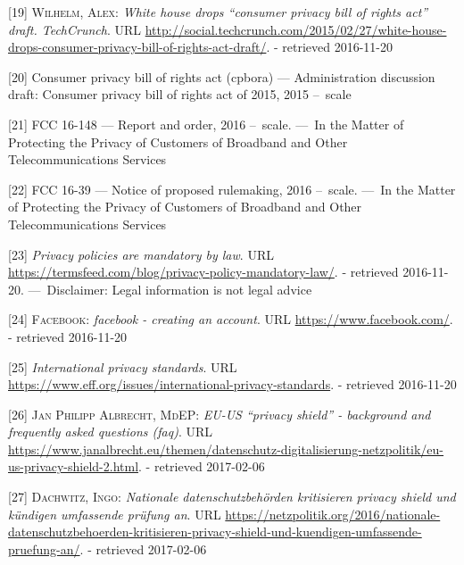 \documentclass[12pt,english,a4paper,titlepage,cleardoublepage=empty,dottedtoc]{report}
\begin{document}
\hypertarget{ref-web_2015_white-house-releases-consumer-privacy-bill-draft}{}
{[}19{]} \textsc{Wilhelm, Alex}: \emph{White house drops ``consumer
privacy bill of rights act'' draft. TechCrunch}. URL
\url{http://social.techcrunch.com/2015/02/27/white-house-drops-consumer-privacy-bill-of-rights-act-draft/}.
- retrieved 2016-11-20

\hypertarget{ref-bill-draft_2015_us_consumer-privacy-bill-of-rights-act_definition}{}
{[}20{]} Consumer privacy bill of rights act (cpbora) --- Administration
discussion draft: Consumer privacy bill of rights act of 2015, 2015
--~scale

\hypertarget{ref-rules_2016_fcc_to-protect-broadband-consumer-privacy_sensitive-types-of-data}{}
{[}21{]} FCC 16-148 --- Report and order, 2016 --~scale. ---~In the
Matter of Protecting the Privacy of Customers of Broadband and Other
Telecommunications Services

\hypertarget{ref-rules_2016_fcc_to-protect-broadband-consumer-privacy_personally-identifiable-information}{}
{[}22{]} FCC 16-39 --- Notice of proposed rulemaking, 2016 --~scale.
---~In the Matter of Protecting the Privacy of Customers of Broadband
and Other Telecommunications Services

\hypertarget{ref-web_2016_privacy-policies-are-mandatory-by-law}{}
{[}23{]} \emph{Privacy policies are mandatory by law}. URL
\url{https://termsfeed.com/blog/privacy-policy-mandatory-law/}. -
retrieved 2016-11-20. ---~Disclaimer: Legal information is not legal
advice

\hypertarget{ref-web_2016_facebooks-landing-page_policy-acknowledgement}{}
{[}24{]} \textsc{Facebook}: \emph{facebook - creating an account}. URL
\url{https://www.facebook.com/}. - retrieved 2016-11-20

\hypertarget{ref-web_2016_international-privacy-standards}{}
{[}25{]} \emph{International privacy standards}. URL
\url{https://www.eff.org/issues/international-privacy-standards}. -
retrieved 2016-11-20

\hypertarget{ref-web_2017_privacy-shield_faq}{}
{[}26{]} \textsc{Jan Philipp Albrecht, MdEP}: \emph{EU-US ``privacy
shield'' - background and frequently asked questions (faq)}. URL
\url{https://www.janalbrecht.eu/themen/datenschutz-digitalisierung-netzpolitik/eu-us-privacy-shield-2.html}.
- retrieved 2017-02-06

\hypertarget{ref-web_2017_privacy-shield_kritik}{}
{[}27{]} \textsc{Dachwitz, Ingo}: \emph{Nationale datenschutzbehörden
kritisieren privacy shield und kündigen umfassende prüfung an}. URL
\url{https://netzpolitik.org/2016/nationale-datenschutzbehoerden-kritisieren-privacy-shield-und-kuendigen-umfassende-pruefung-an/}.
- retrieved 2017-02-06
\end{document}
